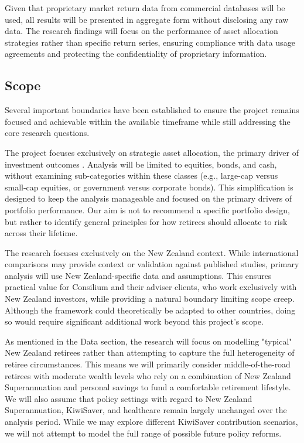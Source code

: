 \documentclass[11pt]{article}
\begin{document}
Given that proprietary market return data from commercial databases will be used, all results will be presented in aggregate form without disclosing any raw data. The research findings will focus on the performance of asset allocation strategies rather than specific return series, ensuring compliance with data usage agreements and protecting the confidentiality of proprietary information.


\subsection{Scope}

Several important boundaries have been established to ensure the project remains focused and achievable within the available timeframe while still addressing the core research questions.

The project focuses exclusively on strategic asset allocation, the primary driver of investment outcomes \parencite{ibbotsonAssetAllocation}. Analysis will be limited to equities, bonds, and cash, without examining sub-categories within these classes (e.g., large-cap versus small-cap equities, or government versus corporate bonds). This simplification is designed to keep the analysis manageable and focused on the primary drivers of portfolio performance. Our aim is not to recommend a specific portfolio design, but rather to identify general principles for how retirees should allocate to risk across their lifetime.

The research focuses exclusively on the New Zealand context. While international comparisons may provide context or validation against published studies, primary analysis will use New Zealand-specific data and assumptions. This ensures practical value for Consilium and their adviser clients, who work exclusively with New Zealand investors, while providing a natural boundary limiting scope creep. Although the framework could theoretically be adapted to other countries, doing so would require significant additional work beyond this project's scope.

As mentioned in the Data section, the research will focus on modelling "typical" New Zealand retirees rather than attempting to capture the full heterogeneity of retiree circumstances. This means we will primarily consider middle-of-the-road retirees with moderate wealth levels who rely on a combination of New Zealand Superannuation and personal savings to fund a comfortable retirement lifestyle. We will also assume that policy settings with regard to New Zealand Superannuation, KiwiSaver, and healthcare remain largely unchanged over the analysis period. While we may explore different KiwiSaver contribution scenarios, we will not attempt to model the full range of possible future policy reforms. 
\end{document}
